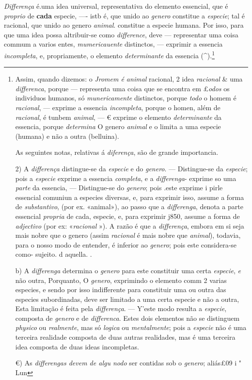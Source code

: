  
\emph{Differença} é.uma idea universal, representativa do elemento essencial, que é \emph{proprio} de \textbf{cada} especie, ---- istb é, que unido ao \emph{genero} constitue a \emph{especie}; tal é racional, que unido ao genero \emph{animal}. constitue a especie humana. Por isso, para que uma idea possa altribuir-se como \emph{difference}, deve --- representar uma coisa commum a varios entes, \emph{mumericauente} distinctos, --- exprimir a essencia \emph{incompleta}, e, propriamente, o elemento \emph{determinante} da essencia (\textasciicircum{}).\footnote{Assim, quando dizemos: o \emph{Jromem é animal} racional, 2 idea \emph{racional} \& uma \emph{differenca}, porque --- representa uma coisa que se encontra em £\emph{odos} os individuos humanos, só \emph{munericamente} distinctos, porque \emph{todo} o homem é \emph{racional}, --- exprime a essencia \emph{incompleta}, porque o homen, além de \emph{racional}, é tunbem \emph{animal}, --- € exprime o elemento \emph{determinante} da essencia, porque \emph{determina} O genero \emph{animal} e o limita a uma especie (humana) e não a outra (belluina).\par As seguintes notas, relativas á \emph{diferença}, são de grande importancia.\par 2) A \emph{differença} distingue-se da \emph{especie} e do \emph{genero}. --- Distingue-se da \emph{especie}; pois a \emph{especie} exprime a essencia \emph{completa}, e a \emph{differenga}- exprime so uma \emph{parte} da essencia, --- Distingue-se do \emph{genero}; pois .este exprime i pirle essencial comuniun a especies diversas, e, para exprimir isso, assume a forma de \emph{substantivo}, (por ex. «animal»), ao passo que a \emph{differenga}, denota a parte essencial \emph{propria} de cada, especie, e, para exprimir j850, assume a forma de \emph{adjectivo} (por ex: «\emph{racional} »). A razão é que a \emph{differença}, embora em si seja mais nobre que o genero (assim \emph{racional} é mais nobre que \emph{animal}), todavia, para o nosso modo de entender, é inferior ao \emph{genero}; pois este considera-se como- sujeito. d aquella. .\par b) A \emph{differenga} determina o \emph{genero} para este constituir uma certa \emph{especie}, \emph{e} não outra, Porquanto, O \emph{genero}, exprimindo o elemento comm 2 varias especies, e sendo por isso indifferente para constituir uma ou outra das especies subordinadas, deve ser limitado a uma certa especie e não a outra, Esta limitação é feita pela \emph{differença}. --- Y'este modo resulta a \emph{especie}, composta de \emph{genero} e de \emph{differenca}. Estes dois elementos não se distinguem \emph{physico} ou \emph{realmente}, mas só \emph{logica} ou \emph{mentalmente}; pois a \emph{especie} não é uma terceira realidade composta de duas autras realidades, mas é uma terceira idea composta de duas ideas incompletas.\par €) As \emph{differengas devem de algu nodo} ser contidas sob o \emph{genero}; aliás£09 i " Lun}

